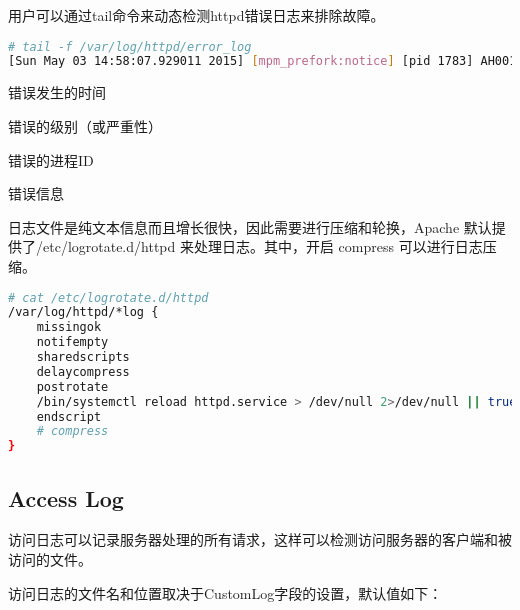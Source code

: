 用户可以通过tail命令来动态检测httpd错误日志来排除故障。



\begin{lstlisting}[language=bash]
# tail -f /var/log/httpd/error_log
[Sun May 03 14:58:07.929011 2015] [mpm_prefork:notice] [pid 1783] AH00163: Apache/2.4.10 (Fedora) OpenSSL/1.0.1k-fips PHP/5.6.8 configured -- resuming normal operations
\end{lstlisting}

\begin{compactitem}
\item 错误发生的时间
\item 错误的级别（或严重性）
\item 错误的进程ID
\item 错误信息
\end{compactitem}


日志文件是纯文本信息而且增长很快，因此需要进行压缩和轮换，Apache 默认提供了/etc/logrotate.d/httpd 来处理日志。其中，开启 compress 可以进行日志压缩。




\begin{lstlisting}[language=bash]
# cat /etc/logrotate.d/httpd
/var/log/httpd/*log {
	missingok
	notifempty
	sharedscripts
	delaycompress
	postrotate
	/bin/systemctl reload httpd.service > /dev/null 2>/dev/null || true
	endscript
	# compress
}
\end{lstlisting}


\subsection{Access Log}


访问日志可以记录服务器处理的所有请求，这样可以检测访问服务器的客户端和被访问的文件。

访问日志的文件名和位置取决于CustomLog字段的设置，默认值如下：


